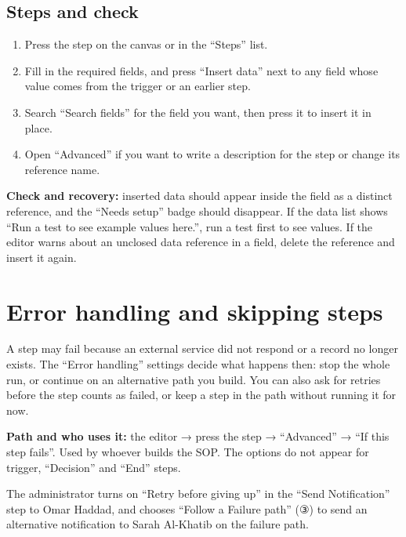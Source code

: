 \subsection{Steps and check}
\begin{enumerate}
\item Press the step on the canvas or in the “Steps” list.
\item Fill in the required fields, and press “Insert data” next to any field whose value comes from the trigger or an earlier step.
\item Search “Search fields” for the field you want, then press it to insert it in place.
\item Open “Advanced” if you want to write a description for the step or change its reference name.
\end{enumerate}

\textbf{Check and recovery:} inserted data should appear inside the field as a distinct reference, and the “Needs setup” badge should disappear. If the data list shows “Run a test to see example values here.”, run a test first to see values. If the editor warns about an unclosed data reference in a field, delete the reference and insert it again.

\clearpage
\section{Error handling and skipping steps}
\label{sec:builder-feature-isop-errors}

A step may fail because an external service did not respond or a record no longer exists. The “Error handling” settings decide what happens then: stop the whole run, or continue on an alternative path you build. You can also ask for retries before the step counts as failed, or keep a step in the path without running it for now.

\textbf{Path and who uses it:} the editor → press the step → “Advanced” → “If this step fails”. Used by whoever builds the SOP. The options do not appear for trigger, “Decision” and “End” steps.

\begin{rcnote}
The administrator turns on “Retry before giving up” in the “Send Notification” step to Omar Haddad, and chooses “Follow a Failure path” (③) to send an alternative notification to Sarah Al-Khatib on the failure path.
\end{rcnote}

